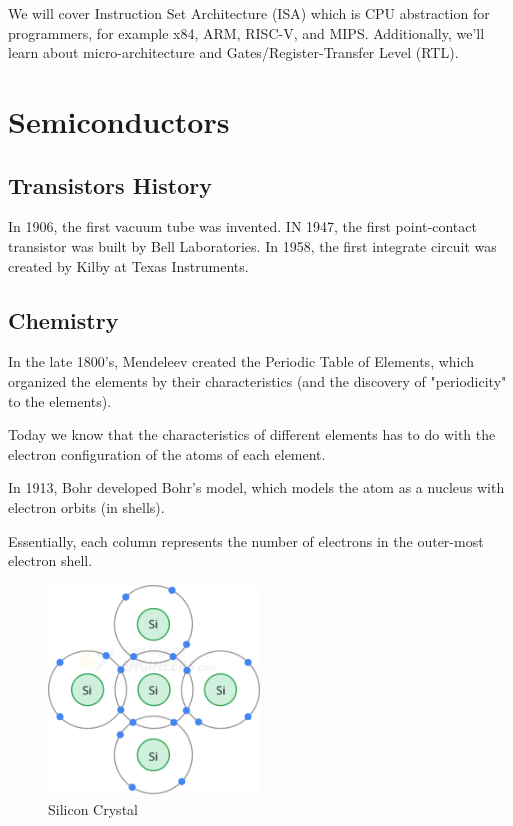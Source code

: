 \documentclass[00_complete]{subfiles}
\begin{document}
We will cover Instruction Set Architecture (ISA) which is CPU abstraction for
programmers, for example x84, ARM, RISC-V, and MIPS. Additionally, we'll learn
about micro-architecture and Gates/Register-Transfer Level (RTL).
\section{Semiconductors}
\subsection{Transistors History}
In 1906, the first vacuum tube was invented. IN 1947, the first point-contact
transistor was built by Bell Laboratories. In 1958, the first integrate circuit
was created by Kilby at Texas Instruments.

\subsection{Chemistry}
In the late 1800's, Mendeleev created the Periodic Table of Elements, which
organized the elements by their characteristics (and the discovery of
"periodicity" to the elements).

Today we know that the characteristics of different elements has to do with the
electron configuration of the atoms of each element.

In 1913, Bohr developed Bohr's model, which models the atom as a nucleus with
electron orbits (in shells). 

Essentially, each column represents the number of electrons in the outer-most
electron shell.

\begin{figure}[ht!]
    \begin{center}
        \includegraphics[width=0.5\textwidth]{silicon-crystal.png}
    \end{center}
    \caption{Silicon Crystal}
\end{figure}
\end{document}
